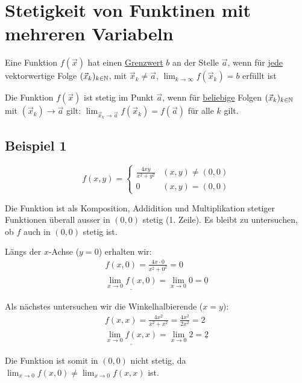 \section{Stetigkeit von Funktinen mit mehreren Variabeln}
\begin{definition}[Grenzwert]
Eine Funktion $f(\vec{x})$ hat einen \underline{Grenzwert} $b$ an der Stelle
$\vec{a}$, wenn für \underline{jede} vektorwertige Folge $(\vec{x}_k)_{k \in \mathbb{N}}$,
mit $\vec{x}_k \neq \vec{a}$, $\lim_{k \to \infty}f(\vec{x}_k) = b$ erfüllt ist
\end{definition}
\begin{definition}[Stetigkeit]
Die Funktion $f(\vec{x})$ ist stetig im Punkt $\vec{a}$, wenn für
\underline{beliebige} Folgen $(\vec{x}_k)_{k \in \mathbb{N}}$ mit
$(\vec{x}_k) \to \vec{a}$ gilt: $\lim_{\vec{x}_k \to \vec{a}} f(\vec{x}_k) = f(\vec{a})$
für alle $k$ gilt.
\end{definition}

\subsection{Beispiel 1}
\[
f(x, y) = \begin{cases}
	\frac{4xy}{x^2 + y^2} & (x,y) \neq (0,0)\\
	0 & (x,y) = (0,0)
\end{cases}
\]

Die Funktion ist als Komposition, Addidition und Multiplikation stetiger
Funktionen überall ausser in $(0,0)$ stetig (1. Zeile). Es bleibt zu untersuchen,
ob $f$ auch in $(0,0)$ stetig ist.

Längs der $x$-Achse ($y = 0$) erhalten wir:
\begin{align*}
f(x, 0) = \frac{4x \cdot 0}{x^2 + 0^2} = 0\\
\underline{\lim_{x \to 0} f(x, 0)} = \lim_{x \to 0} 0 = \underline{0}
\end{align*}

Als nächstes untersuchen wir die Winkelhalbierende ($x = y$):
\begin{align*}
f(x, x) = \frac{4x^2}{x^2 + x^2} = \frac{4x^2}{2x^2} = 2\\
\underline{\lim_{x \to 0} f(x, x)} = \lim_{x \to 0} 2 = \underline{2}
\end{align*}

Die Funktion ist somit in $(0,0)$ nicht stetig, da
$\lim_{x \to 0} f(x, 0) \neq \lim_{x \to 0} f(x, x)$ ist.